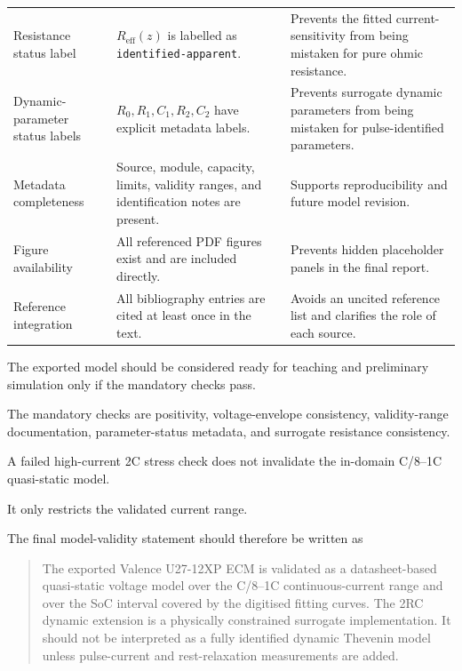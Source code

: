 \documentclass[a4paper,12pt]{article}
\begin{document}
\begin{table}[H]
\begin{tabularx}{0.98\textwidth}{@{}L{0.31\textwidth}Y Y@{}}
Resistance status label &
\(R_{\mathrm{eff}}(z)\) is labelled as \texttt{identified-apparent}. &
Prevents the fitted current-sensitivity from being mistaken for pure ohmic resistance. \\
Dynamic-parameter status labels &
\(R_0,R_1,C_1,R_2,C_2\) have explicit metadata labels. &
Prevents surrogate dynamic parameters from being mistaken for pulse-identified parameters. \\
Metadata completeness &
Source, module, capacity, limits, validity ranges, and identification notes are present. &
Supports reproducibility and future model revision. \\
Figure availability &
All referenced PDF figures exist and are included directly. &
Prevents hidden placeholder panels in the final report. \\
Reference integration &
All bibliography entries are cited at least once in the text. &
Avoids an uncited reference list and clarifies the role of each source. \\
\bottomrule
\end{tabularx}
\end{table}

The exported model should be considered ready for teaching and preliminary simulation only if the mandatory checks pass.

The mandatory checks are positivity, voltage-envelope consistency, validity-range documentation, parameter-status metadata, and surrogate resistance consistency.

A failed high-current 2C stress check does not invalidate the in-domain C/8--1C quasi-static model.

It only restricts the validated current range.

The final model-validity statement should therefore be written as
\begin{quote}
The exported Valence U27-12XP ECM is validated as a datasheet-based quasi-static voltage model over the C/8--1C continuous-current range and over the SoC interval covered by the digitised fitting curves.
The 2RC dynamic extension is a physically constrained surrogate implementation.
It should not be interpreted as a fully identified dynamic Thevenin model unless pulse-current and rest-relaxation measurements are added.
\end{quote}

\clearpage
\newpage
\end{document}
